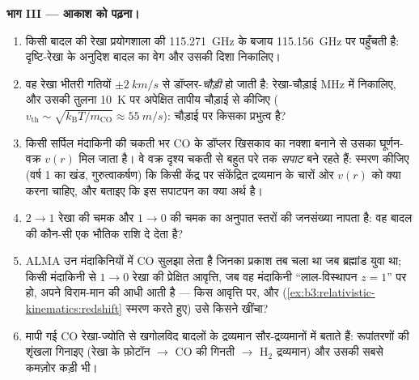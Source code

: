 \begin{problem}[{सप्ताहांत समस्या --- कार्बन मोनोऑक्साइड, रेडियो
खगोलिकी और ठंडा ब्रह्मांड}]
\medskip\noindent\textbf{भाग III --- आकाश को पढ़ना।}
\begin{enumerate}[resume]
  \item किसी बादल की रेखा प्रयोगशाला की \qty{115.271}{GHz} के बजाय
        \qty{115.156}{GHz} पर पहुँचती है: दृष्टि-रेखा के अनुदिश
        बादल का वेग और उसकी दिशा निकालिए।
  \item वह रेखा भीतरी गतियों $\pm\qty{2}{km/s}$ से डॉप्लर-\emph{चौड़ी}
        हो जाती है: रेखा-चौड़ाई MHz में निकालिए, और उसकी तुलना
        \qty{10}{K} पर अपेक्षित तापीय चौड़ाई से कीजिए
        ($v_{\text{th}} \sim \sqrt{k_{\text{B}}T/m_{\text{CO}}}
        \approx \qty{55}{m/s}$): चौड़ाई पर किसका प्रभुत्व है?
  \item किसी सर्पिल मंदाकिनी की चकती भर CO के डॉप्लर खिसकाव का नक्शा
        बनाने से उसका घूर्णन-वक्र $v(r)$ मिल जाता है। वे वक्र दृश्य
        चकती से बहुत परे तक \emph{सपाट} बने रहते हैं: स्मरण कीजिए
        (वर्ष 1 का खंड, गुरुत्वाकर्षण) कि किसी केंद्र पर संकेंद्रित
        द्रव्यमान के चारों ओर $v(r)$ को क्या करना चाहिए, और बताइए कि
        इस सपाटपन का क्या अर्थ है।
  \item $2\to1$ रेखा की चमक और $1\to0$ की चमक का अनुपात स्तरों की
        जनसंख्या नापता है: वह बादल की कौन-सी एक भौतिक राशि दे देता है?
  \item ALMA उन मंदाकिनियों में CO सुलझा लेता है जिनका प्रकाश तब
        चला था जब ब्रह्मांड युवा था; किसी मंदाकिनी से
        $1 \to 0$ रेखा की प्रेक्षित आवृत्ति, जब वह मंदाकिनी
        ``लाल-विस्थापन $z = 1$'' पर हो, अपने विराम-मान की आधी आती है
        --- किस आवृत्ति पर, और
        (\cref{ex:b3:relativistic-kinematics:redshift} स्मरण करते
        हुए) उसे किसने खींचा?
  \item मापी गई CO रेखा-ज्योति से खगोलविद बादलों के द्रव्यमान
        सौर-द्रव्यमानों में बताते हैं: रूपांतरणों की शृंखला गिनाइए
        (रेखा के फ़ोटॉन $\to$ CO की गिनती $\to$ H$_2$ द्रव्यमान)
        और उसकी सबसे कमज़ोर कड़ी भी।
\end{enumerate}


\end{problem}
